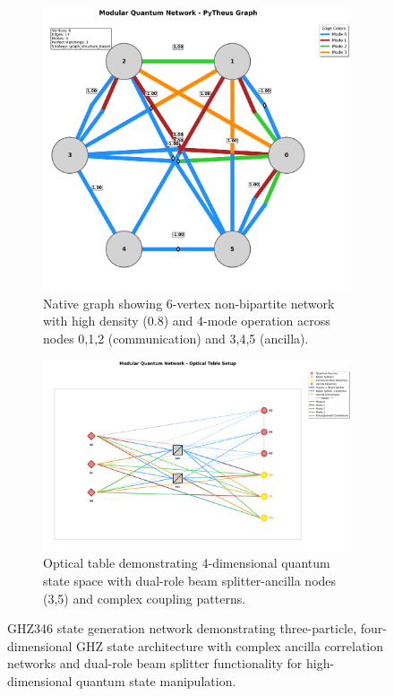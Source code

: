 \documentclass[11pt,a4paper]{article}
\begin{document}
\begin{figure}[htbp]
\centering
\begin{subfigure}{0.45\textwidth}
\includegraphics[width=\textwidth]{journal_ghz346_state_native_plot.png}
\caption{Native graph showing 6-vertex non-bipartite network with high density (0.8) and 4-mode operation across nodes 0,1,2 (communication) and 3,4,5 (ancilla).}
\end{subfigure}
\hfill
\begin{subfigure}{0.45\textwidth}
\includegraphics[width=\textwidth]{journal_ghz346_state_optical_table_setup.png}
\caption{Optical table demonstrating 4-dimensional quantum state space with dual-role beam splitter-ancilla nodes (3,5) and complex coupling patterns.}
\end{subfigure}
\caption{GHZ346 state generation network demonstrating three-particle, four-dimensional GHZ state architecture with complex ancilla correlation networks and dual-role beam splitter functionality for high-dimensional quantum state manipulation.}
\label{fig:ghz346_analysis}
\end{figure}
\end{document}
